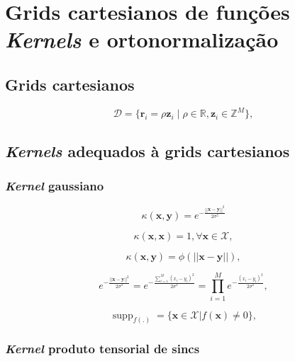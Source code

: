 \chapter{Grids cartesianos de funções \textit{Kernels} e ortonormalização} \label{cap:kernels}

\section{Grids cartesianos}

\begin{equation}
    \mathcal{D} = \{ \mathbf{r}_i = \rho\mathbf{z}_i\;|\;\rho \in \mathbb{R}, \mathbf{z}_i \in \mathbb{Z}^M \},
\end{equation}

\section{\textit{Kernels} adequados à grids cartesianos}

\subsection{\textit{Kernel} gaussiano}

\begin{equation}
    \kappa(\mathbf{x},\mathbf{y}) = e^{-\frac{||\mathbf{x} - \mathbf{y}||^2}{2\sigma^2}}
\end{equation}

\begin{equation*}
  \kappa(\mathbf{x},\mathbf{x}) = 1, \forall \mathbf{x} \in \mathcal{X},  
\end{equation*}

\begin{equation*}
    \kappa(\mathbf{x},\mathbf{y}) = \phi(||\mathbf{x} - \mathbf{y}||),
\end{equation*}

\begin{equation}
    e^{-\frac{||\mathbf{x} - \mathbf{y}||^2}{2\sigma^2}} = e^{-\frac{\sum_{i=1}^{M}(x_i-y_i)^2}{2\sigma^2}} = \prod_{i=1}^{M}e^{-\frac{(x_i-y_i)^2}{2\sigma^2}},
\end{equation}

\begin{equation}
    \operatorname{supp}_{f(.)} = \{ \mathbf{x} \in \mathcal{X} | f(\mathbf{x}) \neq 0 \},
\end{equation}

\subsection{\textit{Kernel} produto tensorial de sincs}

